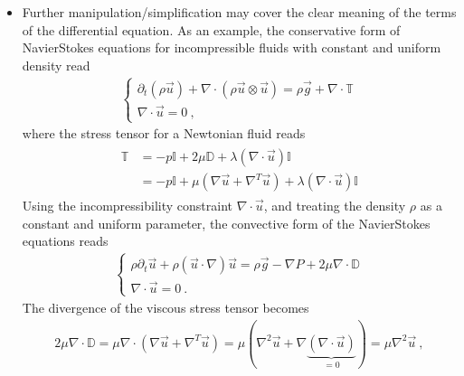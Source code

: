 \documentclass[letterpaper,10pt,english]{jupyterBook}
\begin{document}
\begin{itemize}
\item {} 
\sphinxAtStartPar
Further manipulation/simplification may cover the clear meaning of the terms of the differential equation. As an example, the conservative form of Navier\sphinxhyphen{}Stokes equations for incompressible fluids with constant and uniform density read
\begin{equation*}
\begin{split}\begin{cases}
    \partial_t \left( \rho \vec{u} \right) + \nabla \cdot ( \rho \vec{u} \otimes \vec{u} ) = \rho \vec{g} + \nabla \cdot \mathbb{T} \\
    \nabla \cdot \vec{u} = 0 \ ,
  \end{cases}\end{split}
\end{equation*}
\sphinxAtStartPar
where the stress tensor for a Newtonian fluid reads
\begin{equation*}
\begin{split}\begin{aligned}
    \mathbb{T}
    & = - p \mathbb{I} + 2 \mu \mathbb{D} + \lambda \left( \nabla \cdot \vec{u} \right) \mathbb{I} \\
    & = - p \mathbb{I} + \mu \left( \nabla \vec{u} + \nabla^T \vec{u} \right) + \lambda \left( \nabla \cdot \vec{u} \right) \mathbb{I}
  \end{aligned}\end{split}
\end{equation*}
\sphinxAtStartPar
Using the incompressibility constraint \(\nabla \cdot \vec{u}\), and treating the density \(\rho\) as a constant and uniform parameter, the convective form of the Navier\sphinxhyphen{}Stokes equations reads
\begin{equation*}
\begin{split}\begin{cases}
    \rho \partial_t \vec{u} + \rho \left( \vec{u} \cdot \nabla \right) \vec{u} = \rho \vec{g} - \nabla P + 2 \mu \nabla \cdot \mathbb{D} \\
    \nabla \cdot \vec{u} = 0 \ .
  \end{cases}\end{split}
\end{equation*}
\sphinxAtStartPar
The divergence of the viscous stress tensor becomes
\begin{equation*}
\begin{split}2 \mu \nabla \cdot \mathbb{D} = \mu \nabla \cdot \left( \nabla \vec{u} + \nabla^T \vec{u} \right) = \mu \left( \nabla^2 \vec{u} + \nabla \underbrace{\left( \nabla \cdot \vec{u} \right)}_{= 0} \right) = \mu \nabla^2 \vec{u} \ ,\end{split}

\end{equation*}
\end{itemize}
\end{document}
